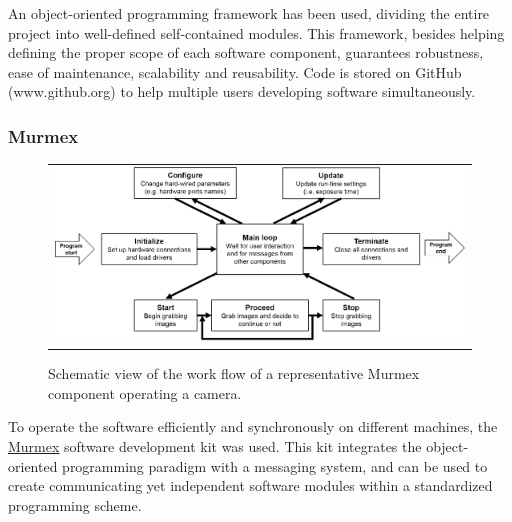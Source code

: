 \documentclass[12pt]{spieman}  %
\begin{document}
An object-oriented programming framework \cite{castagna1997object} has been used, dividing the entire project into well-defined self-contained modules. This framework, besides helping defining the proper scope of each software component, guarantees robustness, ease of maintenance, scalability and reusability. Code is stored on GitHub (www.github.org) to help multiple users developing software simultaneously. %

\subsubsection{Murmex}
\label{sec:murmex}
	\begin{figure}
   \begin{center}
   \begin{tabular}{c}
   \includegraphics[width=\textwidth]{murmex.eps}
   \end{tabular}
   \end{center}
   \caption{\label{fig:murmex} Schematic view of the work flow of a representative Murmex component operating a camera.} 
   \end{figure}

To operate the software efficiently and synchronously on different machines, the \href{http://sine.ni.com/nips/cds/view/p/lang/en/nid/212895}{Murmex} software development kit was used. This kit integrates the object-oriented programming paradigm with a messaging system, and can be used to create communicating yet independent software modules within a standardized programming scheme.
\end{document}
